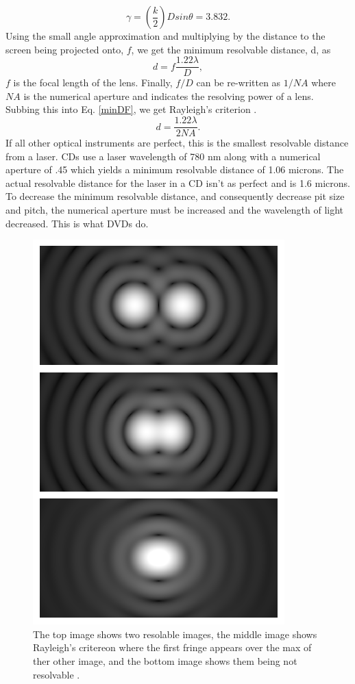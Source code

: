 \documentclass[ notitlepage, numerical, 11pt]{revtex4-1} %
\begin{document}
\begin{equation}
\gamma = (\frac{k}{2})Dsin\theta = 3.832.
\label{gamma}
\end{equation}  
Using the small angle approximation and multiplying by the distance to the screen being projected onto, $f$, we get the minimum resolvable distance, d, as
\begin{equation}
d = f\frac{1.22\lambda}{D},
\label{minDF}
\end{equation}
$f$ is the focal length of the lens. Finally, $f/D$ can be re-written as $1/NA$ where $NA$ is the numerical aperture and indicates the resolving power of a lens. Subbing this into Eq. \ref{minDF}, we get Rayleigh's criterion \cite{memory}.
\begin{equation}
d = \frac{1.22\lambda}{2NA}.
\label{rayleigh}
\end{equation}
If all other optical instruments are perfect, this is the smallest resolvable distance from a laser. CDs use a laser wavelength of 780 nm along with a numerical aperture of .45 which yields a minimum resolvable distance of 1.06 microns. The actual resolvable distance for the laser in a CD isn't as perfect and is 1.6 microns. To decrease the minimum resolvable distance, and consequently decrease pit size and pitch, the numerical aperture must be increased and the wavelength of light decreased. This is what DVDs do.


\begin{figure}[H]
\centerline{\includegraphics[scale=.45]{criterion.png}}
\caption{The top image shows two resolable images, the middle image shows Rayleigh's critereon where the first fringe appears over the max of ther other image, and the bottom image shows them being not resolvable \cite{rayleigh}.}
\label{criterion}
\end{figure} 
\end{document}
